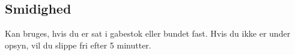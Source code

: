 \subsection*{Smidighed}
Kan bruges, hvis du er sat i gabestok eller bundet fast. Hvis du ikke er under opsyn, vil du slippe fri efter 5 minutter.\\
